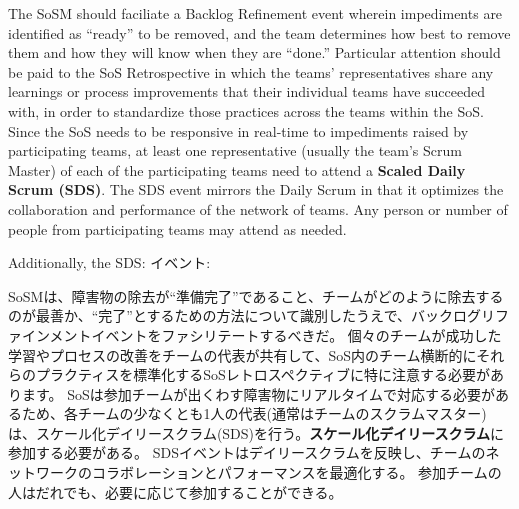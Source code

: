 \documentclass[12pt,a4paper,parskip=full]{scrartcl}
\begin{document}
The SoSM should faciliate a Backlog Refinement event wherein impediments are identified as ``ready'' to be removed, and the team determines how best to remove them and how they will know when they are ``done.''
Particular attention should be paid to the SoS Retrospective in which the teams' representatives share any learnings or process improvements that their individual teams have succeeded with, in order to standardize those practices across the teams within the SoS.  Since the SoS needs to be responsive in real-time to impediments raised by participating teams, at least one representative (usually the team's Scrum Master) of each of the participating teams need to attend a \textbf{Scaled Daily Scrum (SDS)}. The SDS event mirrors the Daily Scrum in that it optimizes the collaboration and performance of the network of teams. Any person or number of people from participating teams may attend as needed.

Additionally, the SDS:
\fi
イベント:

SoSMは、障害物の除去が``準備完了''であること、チームがどのように除去するのが最善か、``完了''とするための方法について識別したうえで、バックログリファインメントイベントをファシリテートするべきだ。
個々のチームが成功した学習やプロセスの改善をチームの代表が共有して、SoS内のチーム横断的にそれらのプラクティスを標準化するSoSレトロスペクティブに特に注意する必要があります。
SoSは参加チームが出くわす障害物にリアルタイムで対応する必要があるため、各チームの少なくとも1人の代表(通常はチームのスクラムマスター)は、スケール化デイリースクラム(SDS)を行う。\textbf{スケール化デイリースクラム}に参加する必要がある。
SDSイベントはデイリースクラムを反映し、チームのネットワークのコラボレーションとパフォーマンスを最適化する。
参加チームの人はだれでも、必要に応じて参加することができる。
\end{document}
